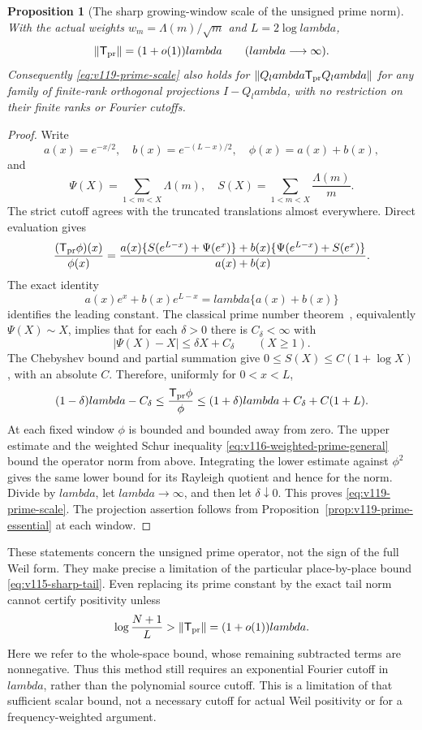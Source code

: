 \documentclass[11pt]{article}
\def\lambda{lambda}%
\newtheorem{proposition}[theorem]{Proposition}
\theoremstyle{remark}
\begin{document}
\begin{proposition}[The sharp growing-window scale of the unsigned prime norm]
\label{prop:v119-prime-scale}
With the actual weights $w_m=\Lambda(m)/\sqrt m$ and $L=2\log\lambda$,
\begin{equation}\label{eq:v119-prime-scale}
 \|\mathsf T_{\rm pr}\|=(1+o(1))\lambda
       \qquad(\lambda\longrightarrow\infty).
\end{equation}
Consequently \eqref{eq:v119-prime-scale} also holds for
$\|Q_\lambda\mathsf T_{\rm pr}Q_\lambda\|$ for any family of
finite-rank orthogonal projections $I-Q_\lambda$, with no restriction on their
finite ranks or Fourier cutoffs.
\end{proposition}
\begin{proof}
Write
\[
 a(x)=e^{-x/2},\quad b(x)=e^{-(L-x)/2},\quad\phi(x)=a(x)+b(x),
\]
and
\[
 \Psi(X)=\sum_{1<m<X}\Lambda(m),\quad
 S(X)=\sum_{1<m<X}\frac{\Lambda(m)}m.
\]
The strict cutoff agrees with the truncated translations almost
everywhere.  Direct evaluation gives
\begin{equation}\label{eq:v119-prime-weight-ratio}
 \frac{(\mathsf T_{\rm pr}\phi)(x)}{\phi(x)}
 =\frac{a(x)\{S(e^{L-x})+\Psi(e^x)\}
       +b(x)\{\Psi(e^{L-x})+S(e^x)\}}{a(x)+b(x)}.
\end{equation}
The exact identity
\[
 a(x)e^x+b(x)e^{L-x}=\lambda\{a(x)+b(x)\}
\]
identifies the leading constant.  The classical prime number
theorem~\cite{NISTPrimeAsymptotics}, equivalently $\Psi(X)\sim X$,
implies that for each $\delta>0$ there is $C_\delta<\infty$ with
\[
 |\Psi(X)-X|\le\delta X+C_\delta\qquad(X\ge1).
\]
The Chebyshev bound and partial summation give
$0\le S(X)\le C(1+\log X)$, with an absolute $C$.
Therefore, uniformly for $0<x<L$,
\[
 (1-\delta)\lambda-C_\delta
 \le\frac{\mathsf T_{\rm pr}\phi}{\phi}
 \le(1+\delta)\lambda+C_\delta+C(1+L).
\]
At each fixed window $\phi$ is bounded and bounded away from zero.
The upper estimate and the weighted Schur inequality
\eqref{eq:v116-weighted-prime-general} bound the operator norm from
above.  Integrating the lower estimate against $\phi^2$ gives the
same lower bound for its Rayleigh quotient and hence for the norm.
Divide by $\lambda$, let $\lambda\to\infty$, and then let
$\delta\downarrow0$. This proves \eqref{eq:v119-prime-scale}.
The projection assertion follows from
Proposition~\ref{prop:v119-prime-essential} at each window.
\end{proof}

These statements concern the unsigned prime operator, not the sign of
the full Weil form.  They make precise a limitation of the particular
place-by-place bound \eqref{eq:v115-sharp-tail}. Even replacing its
prime constant by the exact tail norm cannot certify positivity unless
\begin{equation}\label{eq:v119-unsigned-cutoff}
 \log\frac{N+1}{L}>\|\mathsf T_{\rm pr}\|
       =(1+o(1))\lambda.
\end{equation}
Here we refer to the whole-space bound, whose remaining subtracted
terms are nonnegative. Thus this method still requires an exponential
Fourier cutoff in $\lambda$, rather than the polynomial source cutoff.
This is a limitation of that sufficient scalar bound, not a necessary
cutoff for actual Weil positivity or for a frequency-weighted argument.
\end{document}
